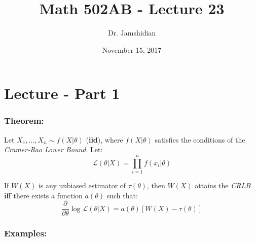 \documentclass{article}
\title{Math 502AB - Lecture 23}
\author{Dr. Jamshidian}
\date{November 15, 2017}
\begin{document}
\maketitle

\section{Lecture - Part 1}

\subsubsection{Theorem:}

Let $X_1,...,X_n \sim f(X|\theta)$ (\textbf{iid}), where $f(X|\theta)$ satisfies the conditions of the \textit{Cramer-Rao Lower Bound}. Let:
\begin{equation*}
    \mathcal{L}(\theta|X) = \prod_{i=1}^n f(x_i|\theta)
\end{equation*}

\noindent If $W(X)$ is any unbiased estimator of $\tau(\theta)$, then $W(X)$ attains the \textit{CRLB} \textbf{iff} there exists a function $a(\theta)$ such that:
\begin{equation*}
    \frac{\partial}{\partial \theta} \log \mathcal{L}(\theta|X) = a(\theta) [W(X)-\tau(\theta)]
\end{equation*}

\subsubsection*{Examples:}
\end{document}
